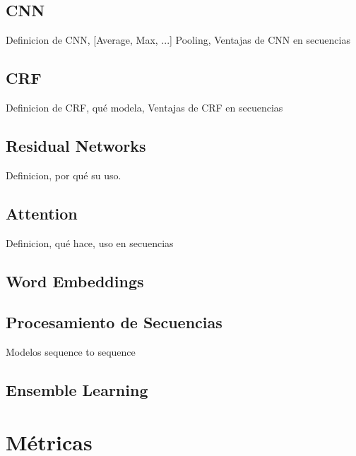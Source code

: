 \subsection{CNN}

Definicion de CNN, [Average, Max, ...] Pooling, Ventajas de CNN en secuencias

\subsection{CRF}

Definicion de CRF, qué modela, Ventajas de CRF en secuencias

\subsection{Residual Networks}

Definicion, por qué su uso.

\subsection{Attention}

Definicion, qué hace, uso en secuencias

\subsection{Word Embeddings}

\subsection{Procesamiento de Secuencias}

Modelos sequence to sequence

\subsection{Ensemble Learning}

\section{Métricas}



